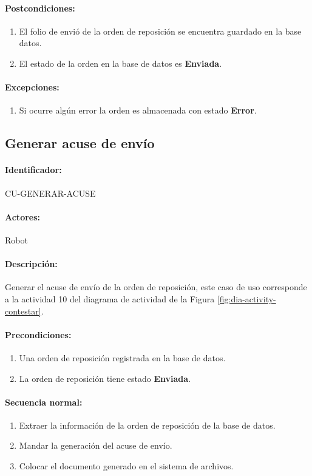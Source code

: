 \paragraph{Postcondiciones:}
\begin{enumerate}
  \item El folio de envió de la orden de reposición se encuentra guardado en la base datos.
  \item El estado de la orden en la base de datos es \textbf{Enviada}.
\end{enumerate}
\paragraph{Excepciones:}
\begin{enumerate}
  \item Si ocurre algún error la orden es almacenada con estado \textbf{Error}.
\end{enumerate}


\subsection{Generar acuse de envío}\label{cu-generar-acuse}
\paragraph{Identificador:}
CU-GENERAR-ACUSE
\paragraph{Actores:}
Robot
\paragraph{Descripción:}
Generar el acuse de envío de la orden de reposición, este caso de uso corresponde a la actividad 10 del diagrama de actividad de la Figura \ref{fig:dia-activity-contestar}.
\paragraph{Precondiciones:}
\begin{enumerate}
  \item Una orden de reposición registrada en la base de datos.
  \item La orden de reposición tiene estado \textbf{Enviada}.
\end{enumerate}
\paragraph{Secuencia normal:}
\begin{enumerate}
  \item Extraer la información de la orden de reposición de la base de datos.
  \item Mandar la generación del acuse de envío.
  \item Colocar el documento generado en el sistema de archivos.
\end{enumerate}
